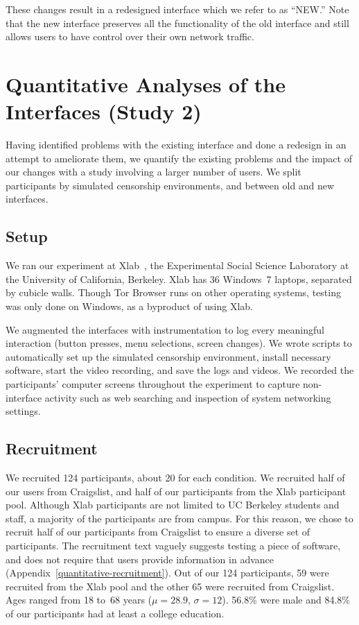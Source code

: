 \documentclass[USenglish,oneside,twocolumn]{article}
\begin{document}
These changes result in a redesigned interface which we refer to as ``NEW.'' Note that the new interface preserves all the functionality of the old interface and still allows users to have control over their own network traffic. 

\section{Quantitative Analyses of the Interfaces (Study 2)}
\label{sec:quantitative}
Having identified problems with the existing interface
and done a redesign in an attempt to ameliorate them,
we quantify the existing problems
and the impact of our changes with a study involving a larger number of users.
We split participants by simulated censorship environments,
and between old and new interfaces.

\subsection{Setup}
We ran our experiment at Xlab~\cite{xlab}, the Experimental Social Science Laboratory at the University of 
California, Berkeley. Xlab has 36 Windows~7 laptops, separated by cubicle walls. 
Though Tor Browser runs on other operating systems,
testing was only done on Windows, as a byproduct of using Xlab. 

We augmented the interfaces with instrumentation 
to log every meaningful interaction
(button presses, menu selections, screen changes).
We wrote scripts to automatically set up the simulated censorship environment, install necessary software, 
start the video recording, and save the logs and videos.
We recorded the participants' computer screens
throughout the experiment to capture non-interface activity such as 
web searching and inspection of system networking settings.

\subsection{Recruitment}
We recruited 124 participants, about 20 for each
condition. We recruited half of our users from Craigslist, and half of our participants from 
the Xlab participant pool. Although Xlab participants are not limited to UC Berkeley students and staff,
a majority of the participants are from campus. For this reason, we chose to recruit 
half of our participants from Craigslist to ensure a diverse set of participants. 
The recruitment text vaguely suggests testing a piece of software, and does not require
that users provide information in advance (Appendix~\ref{quantitative-recruitment}). 
Out of our 124 participants, 59 were recruited from the Xlab pool and the other 65 were
recruited from Craigslist. Ages ranged from 18 to~68 years
($\mu = 28.9$, $\sigma = 12$). 56.8\% were male and 
84.8\% of our participants had at least a college education.
\end{document}

